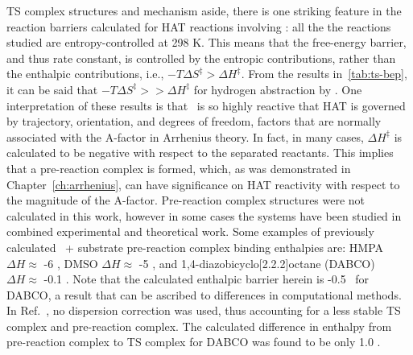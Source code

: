 
TS complex structures and mechanism aside, there is one striking feature in the reaction barriers calculated for HAT reactions involving \cumo: all the the reactions studied are entropy-controlled at 298 K. This means that the free-energy barrier, and thus rate constant, is controlled by the entropic contributions, rather than the enthalpic contributions, i.e., $-T\Delta S^\ddagger > \Delta H^\ddagger$. From the results in~\ref{tab:ts-bep}, it can be said that $-T\Delta S^\ddagger >> \Delta H^\ddagger$ for hydrogen abstraction by \cumo. One interpretation of these results is that \cumo\ is so highly reactive that HAT is governed by trajectory, orientation, and degrees of freedom, factors that are normally associated with the A-factor in Arrhenius theory. In fact, in many cases, $\Delta H^\ddagger$ is calculated to be negative with respect to the separated reactants. This implies that a pre-reaction complex is formed, which, as was demonstrated in Chapter~\ref{ch:arrhenius}, can have significance on HAT reactivity with respect to the magnitude of the A-factor. Pre-reaction complex structures were not calculated in this work, however  in some cases the systems have been studied in combined experimental and theoretical work. Some examples of previously calculated \cumo\ + substrate pre-reaction complex binding enthalpies are: HMPA\footnotemark\ $\Delta H \approx$ -6 \kcalmol, DMSO $\Delta H \approx$ -5 \kcalmol, and 1,4-diazobicyclo[2.2.2]octane (DABCO)\cite{Salamone2011b} $\Delta H \approx$ -0.1 \kcalmol. Note that the calculated enthalpic barrier herein is -0.5 \kcalmol\ for DABCO, a result that can be ascribed to differences in computational methods. In Ref.~, no dispersion correction was used, thus accounting for a less stable TS complex and pre-reaction complex. The calculated difference in enthalpy from pre-reaction complex to TS complex for DABCO was found to be only 1.0 \kcalmol.


